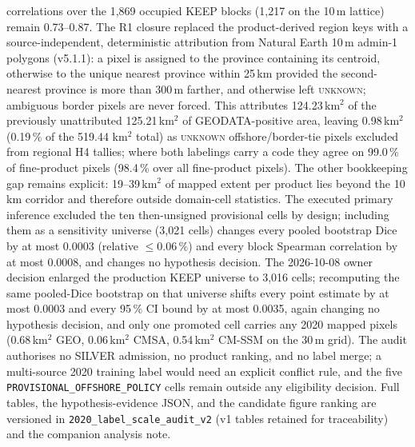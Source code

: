 correlations over the 1{,}869 occupied KEEP blocks (1{,}217 on the
10\,m lattice) remain 0.73--0.87. The R1 closure replaced the
product-derived region keys with a source-independent, deterministic
attribution from Natural Earth 10\,m admin-1 polygons (v5.1.1): a
pixel is assigned to the province containing its centroid, otherwise to
the unique nearest province within 25\,km provided the second-nearest
province is more than 300\,m farther, and otherwise left
\textsc{unknown}; ambiguous border pixels are never forced. This
attributes 124.23\,km$^2$ of the previously unattributed 125.21\,km$^2$
of GEODATA-positive area, leaving 0.98\,km$^2$ (0.19\,\% of the 519.44
km$^2$ total) as \textsc{unknown} offshore/border-tie pixels excluded
from regional H4 tallies; where both labelings carry a code they
agree on 99.0\,\% of fine-product pixels (98.4\,\% over all
fine-product pixels). The other
bookkeeping gap remains explicit: 19--39\,km$^2$ of mapped extent per
product lies beyond the 10\,km corridor and therefore outside
domain-cell statistics. The executed primary inference excluded the
ten then-unsigned provisional cells by design; including them as a
sensitivity universe (3{,}021 cells) changes every pooled bootstrap Dice
by at most 0.0003 (relative $\leq$0.06\,\%) and every block Spearman
correlation by at most 0.0008, and changes no hypothesis decision. The
2026-10-08 owner decision enlarged the production KEEP universe to
3{,}016 cells; recomputing the same pooled-Dice bootstrap on that
universe shifts every point estimate by at most 0.0003 and every
95\,\% CI bound by at most 0.0035, again changing no hypothesis
decision, and only one promoted cell carries any 2020 mapped pixels
(0.68\,km$^2$ GEO, 0.06\,km$^2$ CMSA, 0.54\,km$^2$ CM-SSM on the 30\,m
grid). The audit authorises no SILVER admission, no product ranking, and
no label merge; a multi-source 2020 training label would need an
explicit conflict rule, and the five
\texttt{PROVISIONAL\_OFFSHORE\_POLICY} cells remain outside any
eligibility decision. Full tables, the hypothesis-evidence JSON, and the candidate
figure ranking are versioned in
\texttt{2020\_label\_scale\_audit\_v2} (v1 tables retained for
traceability) and the companion analysis note.

\begin{figure}[t]\centering
{}
\label{fig:boundarydisagreement}
\end{figure}


